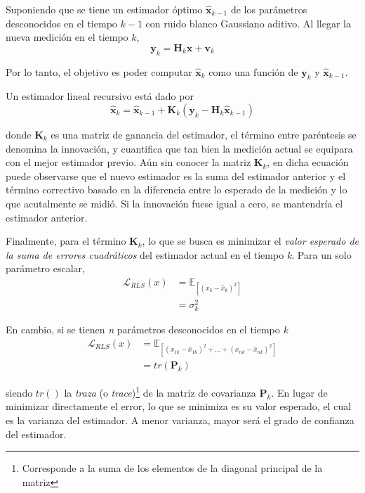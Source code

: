 Suponiendo que se tiene un estimador óptimo $\hat{\textbf{x}}_{k-1}$ de los parámetros desconocidos en el tiempo $k-1$ con ruido blanco Gaussiano aditivo. Al llegar la nueva medición en el tiempo $k$,
\begin{equation}
    \textbf{y}_k = \textbf{H}_k \textbf{x} + \textbf{v}_k
\end{equation}

Por lo tanto, el objetivo es poder computar $\hat{\textbf{x}}_k$ como una función de $\textbf{y}_k$ y $\hat{\textbf{x}}_{k-1}$.

Un estimador lineal recursivo está dado por
\begin{equation}
    \hat{\textbf{x}}_k = \hat{\textbf{x}}_{k-1} + \textbf{K}_k (\textbf{y}_k - \textbf{H}_k \hat{\textbf{x}}_{k-1})
\end{equation}

donde $\textbf{K}_k$ es una matriz de ganancia del estimador, el término entre paréntesis se denomina la innovación, y cuantifica que tan bien la medición actual se equipara con el mejor estimador previo. Aún sin conocer la matriz $\textbf{K}_k$, en dicha ecuación puede observarse que el nuevo estimador es la suma del estimador anterior y el término correctivo basado en la diferencia entre lo esperado de la medición y lo que acutalmente se midió. Si la innovación fuese igual a cero, se mantendría el estimador anterior.

Finalmente, para el término $\textbf{K}_k$, lo que se busca es minimizar el \textit{valor esperado de la suma de errores cuadráticos} del estimador actual en el tiempo \textit{k}. Para un solo parámetro escalar,
\begin{align}
    \mathscr{L}_{RLS}(x) &= \mathbb{E}_{[(x_k - \hat{x}_k)^2]} \\
                         &= \sigma_k^2
\end{align}

En cambio, si se tienen \textit{n} parámetros desconocidos en el tiempo \textit{k}
\begin{align}
    \mathscr{L}_{RLS}(x) &= \mathbb{E}_{[(x_{1k} - \hat{x}_{1k})^2 + ... + (x_{nk} - \hat{x}_{nk})^2]} \\
                         &= tr(\textbf{P}_k)
\end{align}

siendo $tr()$ la \textit{traza} (o \textit{trace})\footnote{Corresponde a la suma de los elementos de la diagonal principal de la matriz} de la matriz de covarianza $\textbf{P}_k$. En lugar de minimizar directamente el error, lo que se minimiza es su valor esperado, el cual es la varianza del estimador. A menor varianza, mayor será el grado de confianza del estimador.

